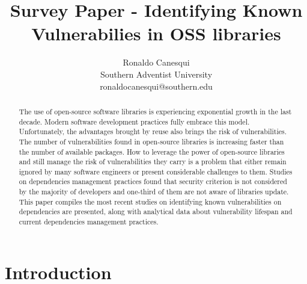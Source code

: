 \documentclass[pdf,bookmarks,colorlinks=true]{IEEEtran}
\title{\bf Survey Paper - Identifying Known Vulnerabilies in OSS libraries}
\author{Ronaldo Canesqui\\
Southern Adventist University\\
ronaldocanesqui@southern.edu
}
\begin{document}
\maketitle

\begin{abstract}

The use of open-source software libraries is experiencing exponential growth in the last decade. Modern software development practices fully embrace this model. Unfortunately, the advantages brought by reuse also brings the risk of vulnerabilities. The number of vulnerabilities found in open-source libraries is increasing faster than the number of available packages. How to leverage the power of open-source libraries and still manage the risk of vulnerabilities they carry is a problem that either remain ignored by many software engineers or present considerable challenges to them. Studies on dependencies management practices found that security criterion is not considered by the majority of developers and one-third of them are not aware of libraries update. This paper compiles the most recent studies on identifying known vulnerabilities on dependencies are presented, along with analytical data about vulnerability lifespan and current dependencies management practices.

\end{abstract}



\section{Introduction}
\label{sec:Introduction}
\end{document}
